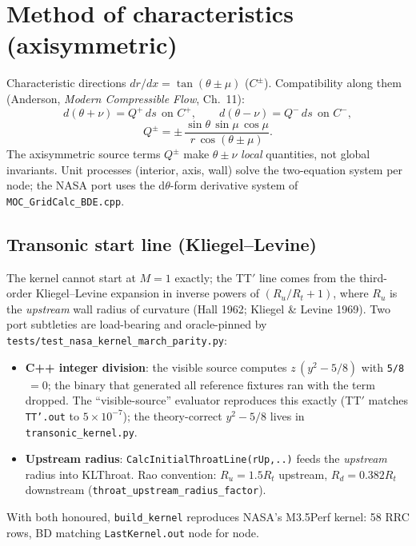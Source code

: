 \documentclass[11pt]{article}
\begin{document}
\section{Method of characteristics (axisymmetric)}
\label{sec:moc}
Characteristic directions $dr/dx=\tan(\theta\pm\mu)$ ($C^\pm$).
Compatibility along them (Anderson, \emph{Modern Compressible Flow},
Ch.~11):
\begin{equation}
d(\theta+\nu) = Q^{+}\,ds \ \ \text{on } C^{+},\qquad
d(\theta-\nu) = Q^{-}\,ds \ \ \text{on } C^{-},
\end{equation}
\begin{equation}
Q^{\pm} = \pm\,\frac{\sin\theta\,\sin\mu\,\cos\mu}{r\,\cos(\theta\pm\mu)} .
\end{equation}
The axisymmetric source terms $Q^\pm$ make $\theta\pm\nu$ \emph{local}
quantities, not global invariants.  Unit processes (interior, axis,
wall) solve the two-equation system per node; the NASA port uses the
d$\theta$-form derivative system of \texttt{MOC\_GridCalc\_BDE.cpp}.

\subsection{Transonic start line (Kliegel--Levine)}
The kernel cannot start at $M=1$ exactly; the TT$'$ line comes from the
third-order Kliegel--Levine expansion in inverse powers of
$(R_u/R_t+1)$, where $R_u$ is the \emph{upstream} wall radius of
curvature (Hall 1962; Kliegel \& Levine 1969).  Two port subtleties are
load-bearing and oracle-pinned by
\texttt{tests/test\_nasa\_kernel\_march\_parity.py}:
\begin{itemize}
  \item \textbf{C++ integer division}: the visible source computes
  $z\,(y^2-5/8)$ with \texttt{5/8}$\,=0$; the binary that generated all
  reference fixtures ran with the term dropped.  The ``visible-source''
  evaluator reproduces this exactly (TT$'$ matches \texttt{TT'.out} to
  $5\times10^{-7}$); the theory-correct $y^2-5/8$ lives in
  \texttt{transonic\_kernel.py}.
  \item \textbf{Upstream radius}: \texttt{CalcInitialThroatLine(rUp,..)}
  feeds the \emph{upstream} radius into KLThroat.  Rao convention:
  $R_u=1.5R_t$ upstream, $R_d=0.382R_t$ downstream
  (\texttt{throat\_upstream\_radius\_factor}).
\end{itemize}
With both honoured, \texttt{build\_kernel} reproduces NASA's M3.5Perf
kernel: 58 RRC rows, BD matching \texttt{LastKernel.out} node for node.
\end{document}
